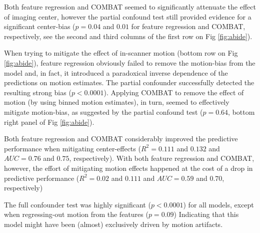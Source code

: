 \documentclass{article}
\begin{document}
Both feature regression and COMBAT seemed to significantly attenuate the effect of imaging center, however the partial confound test still provided evidence for a significant center-bias ($p=0.04$ and $0.01$ for feature regression and COMBAT, respectively, see the second and third columns of the first row on Fig \ref{fig:abide}). 

When trying to mitigate the effect of in-scanner motion (bottom row on Fig \ref{fig:abide}), feature regression obviously failed to remove the motion-bias from the model and, in fact, it introduced a paradoxical inverse dependence of the predictions on motion estimates. The partial confounder successfully detected the resulting strong bias ($p<0.0001$). Applying COMBAT to remove the effect of motion (by using binned motion estimates), in turn, seemed to effectively mitigate motion-bias, as suggested by the partial confound test ($p=0.64$, bottom right panel of Fig \ref{fig:abide}).

Both feature regression and COMBAT considerably improved the predictive performance when mitigating center-effects ($R^2=0.111$ and $0.132$ and $AUC=0.76$ and $0.75$, respectively). With both feature regression and COMBAT, however, the effort of mitigating motion effects happened at the cost of a drop in predictive performance ($R^2=0.02$ and $0.111$ and $AUC=0.59$ and $0.70$, respectively)

The full confounder test was highly significant ($p<0.0001$) for all models, except when regressing-out motion from the features ($p=0.09$) Indicating that this model might have been (almost) exclusively driven by motion artifacts.
\end{document}
